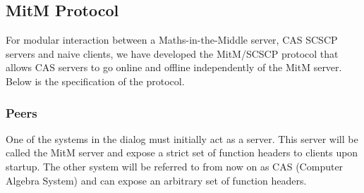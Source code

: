 \subsection{MitM Protocol}
For modular interaction between a Maths-in-the-Middle server, CAS SCSCP servers 
and naive clients, we have developed the MitM/SCSCP protocol that allows CAS 
servers to go online and offline independently of the MitM server. Below is the 
specification of the protocol.

\subsubsection{Peers}
One of the systems in the dialog must initially 
act as a server. This server will be called the MitM server and expose a strict 
set of function headers to clients upon startup. The other system will be referred
to from now on as CAS (Computer Algebra System) and can expose an arbitrary set
of function headers.

